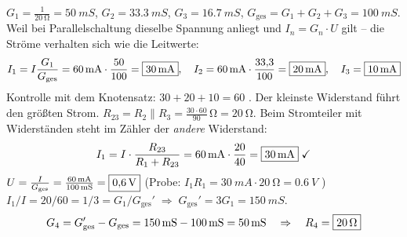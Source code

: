 \documentclass[11pt,a4paper]{article}
\begin{document}
\begin{loesung}
$G_1 = \frac{1}{\SI{20}{\ohm}} = \SI{50}{mS}$, $G_2 = \SI{33.3}{mS}$, $G_3 = \SI{16.7}{mS}$, \quad $G_\text{ges} = G_1+G_2+G_3 = \SI{100}{mS}$.
Weil bei Parallelschaltung dieselbe Spannung anliegt und $I_n = G_n\cdot U$ gilt -- die Ströme verhalten sich wie die Leitwerte:
\[
  I_1 = I\frac{G_1}{G_\text{ges}} = \SI{60}{mA}\cdot\frac{50}{100} = \boxed{\SI{30}{mA}},\quad
  I_2 = \SI{60}{mA}\cdot\frac{33{,}3}{100} = \boxed{\SI{20}{mA}},\quad
  I_3 = \boxed{\SI{10}{mA}}
\]
Kontrolle mit dem Knotensatz: $30 + 20 + 10 = 60$ \checkmark. Der kleinste Widerstand führt den größten Strom.
$R_{23} = R_2\parallel R_3 = \frac{30\cdot 60}{90}\,\si{\ohm} = \SI{20}{\ohm}$. Beim Stromteiler mit Widerständen steht im Zähler der \emph{andere} Widerstand:
\[ I_1 = I\cdot\frac{R_{23}}{R_1 + R_{23}} = \SI{60}{mA}\cdot\frac{20}{40} = \boxed{\SI{30}{mA}} \;\checkmark \]
$U = \frac{I}{G_\text{ges}} = \frac{\SI{60}{mA}}{\SI{100}{mS}} = \boxed{\SI{0.6}{V}}$ \quad (Probe: $I_1R_1 = \SI{30}{mA}\cdot\SI{20}{\ohm} = \SI{0.6}{V}$ \checkmark)
$I_1/I = 20/60 = 1/3 = G_1/G_\text{ges}' \;\Rightarrow\; G_\text{ges}' = 3G_1 = \SI{150}{mS}$.
\[ G_4 = G_\text{ges}' - G_\text{ges} = \SI{150}{mS} - \SI{100}{mS} = \SI{50}{mS} \quad\Rightarrow\quad R_4 = \boxed{\SI{20}{\ohm}} \]
\end{loesung}
\end{document}
